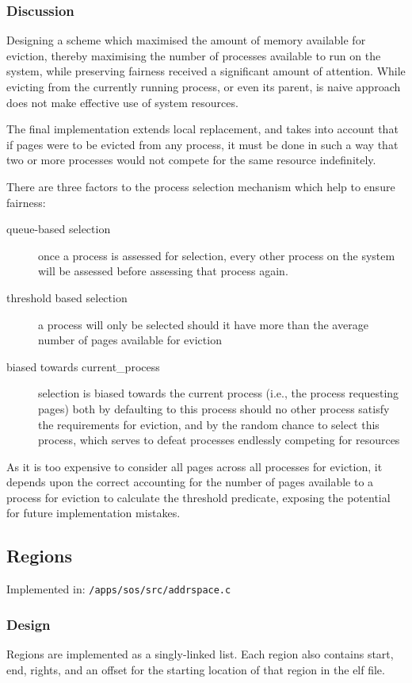\documentclass[a4paper,12pt]{article}
\begin{document}
\subsubsection{Discussion}
Designing a scheme which maximised the amount of memory available for
eviction, thereby maximising the number of processes available to run on the
system, while preserving fairness received a significant amount of attention.
While evicting from the currently running process, or even its parent, is
naive approach does not make effective use of system resources.

The final implementation extends local replacement, and takes into account
that if pages were to be evicted from any process, it must be done in such a
way that two or more processes would not compete for the same resource
indefinitely.

There are three factors to the process selection mechanism which help to
ensure fairness:
\begin{description}
\item[queue-based selection] once a process is assessed for selection, every
  other process on the system will be assessed before assessing that process
  again.
\item[threshold based selection] a process will only be selected should it
  have more than the average number of pages available for eviction
\item[biased towards current\_process] selection is biased towards the current
  process (i.e., the process requesting pages) both by defaulting to this
  process should no other process satisfy the requirements for eviction, and
  by the random chance to select this process, which serves to defeat
  processes endlessly competing for resources
\end{description}

As it is too expensive to consider all pages across all processes for
eviction, it depends upon the correct accounting for the number of pages
available to a process for eviction to calculate the threshold predicate,
exposing the potential for future implementation mistakes.

\subsection{Regions}
Implemented in: \texttt{/apps/sos/src/addrspace.c}

\subsubsection{Design}
Regions are implemented as a singly-linked list.  Each region also contains
start, end, rights, and an offset for the starting location of that region in
the elf file.
\end{document}
